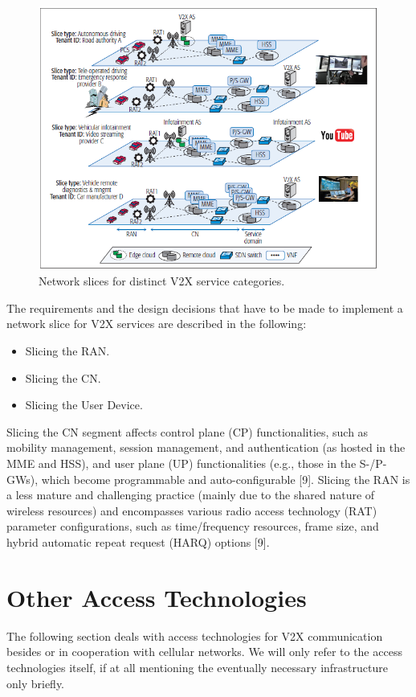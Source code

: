 \documentclass[conference,12pt,onecolumn]{IEEEtran}
\begin{document}
\begin{figure} [ht]
   \centering
  \includegraphics[width=1\linewidth]{_Graphics/slices.png}
  \caption{Network slices for distinct V2X service categories. \cite{campolo2017}}
  \label{fig:slices}
\end{figure}


The requirements and the design decisions that have to be made to implement a network slice for V2X services are described in the following:
\begin{itemize}
\item Slicing the RAN.

\item Slicing the CN.

\item Slicing the User Device.
\end{itemize}


Slicing the CN segment affects control plane
(CP) functionalities, such as mobility management,
session management, and authentication (as hosted
in the MME and HSS), and user plane (UP)
functionalities (e.g., those in the S-/P-GWs), which
become programmable and auto-configurable [9].
Slicing the RAN is a less mature and challenging
practice (mainly due to the shared nature
of wireless resources) and encompasses various
radio access technology (RAT) parameter configurations,
such as time/frequency resources,
frame size, and hybrid automatic repeat request
(HARQ) options [9].




\section{Other Access Technologies}
The following section deals with access technologies for V2X communication besides or in cooperation with cellular networks. We will only refer to the access technologies itself, if at all mentioning the eventually necessary infrastructure only briefly.
\end{document}
